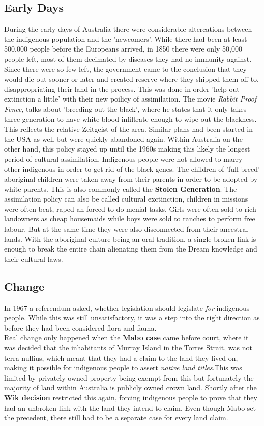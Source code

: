 \documentclass{article}
\begin{document}
	\subsection{Early Days}
	During the early days of Australia there were considerable altercations between the indigenous population and the 'newcomers'. While there had been at least 500,000 people before the Europeans arrived, in 1850 there were only 50,000 people left, most of them decimated by diseases they had no immunity against. Since there were so few left, the government came to the conclusion that they would die out sooner or later and created reserve where they shipped them off to, disappropriating their land in the process. This was done in order 'help out extinction a little' with their new poilicy of assimilation. The movie \textit{Rabbit Proof Fence}, talks about 'breeding out the black', where he states that it only takes three generation to have white blood infiltrate enough to wipe out the blackness. This reflects the relative Zeitgeist of the area. Similar plans had been started in the USA as well but were quickly abandoned again. Within Australia on the other hand, this policy stayed up until the 1960s making this likely the longest period of cultural assimilation. Indigenous people were not allowed to marry other indigenous in order to get rid of the black genes. The children of 'full-breed' aboriginal children were taken away from their parents in order to be adopted by white parents. This is also commonly called the \textbf{Stolen Generation}. The assimilation policy can also be called cultural exctinction, children in missions were often beat, raped an forced to do menial tasks. Girls were often sold to rich landowners as cheap housemaids while boys were sold to ranches to perform free labour. But at the same time they were also disconnected from their ancestral lands. With the aboriginal culture being an oral tradition, a single broken link is enough to break the entire chain alienating them from the Dream knowledge and their cultural laws.
	\subsection{Change}
	In 1967 a referendum asked, whether legislation should legislate \textit{for} indigenous people. While this was still unsatisfactory, it was a step into the right direction as before they had been considered flora and fauna. \\
	Real change only happened when the \textbf{Mabo case} came before court, where it was decided that the inhabitants of Murray Island in the Torres Strait, was not terra nullius, which meant that they had a claim to the land they lived on, making it possible for indigenous people to assert \textit{native land titles}.This was limited by privately owned property being exempt from this but fortunately the majority of land within Australia is publicly owned crown land.  Shortly after the \textbf{Wik decision} restricted this again, forcing indigenous people to prove that they had an unbroken link with the land they intend to claim. Even though Mabo set the precedent, there still had to be a separate case for every land claim. \\
\end{document}
